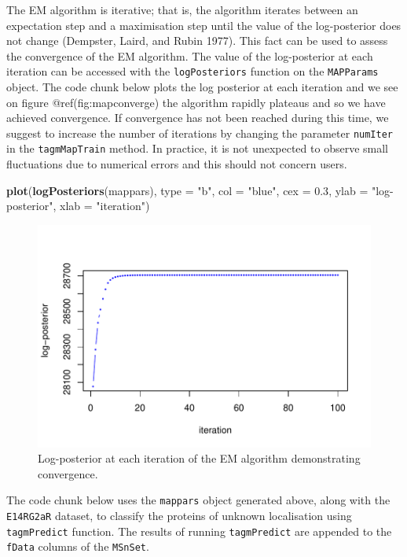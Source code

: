 \documentclass[
]{article}
\newenvironment{Shaded}{\begin{snugshade}}{\end{snugshade}}
\newcommand{\DataTypeTok}[1]{\textcolor[rgb]{0.13,0.29,0.53}{#1}}
\newcommand{\FloatTok}[1]{\textcolor[rgb]{0.00,0.00,0.81}{#1}}
\newcommand{\KeywordTok}[1]{\textcolor[rgb]{0.13,0.29,0.53}{\textbf{#1}}}
\newcommand{\NormalTok}[1]{#1}
\newcommand{\StringTok}[1]{\textcolor[rgb]{0.31,0.60,0.02}{#1}}
\begin{document}
The EM algorithm is iterative; that is, the algorithm iterates between
an expectation step and a maximisation step until the value of the
log-posterior does not change (Dempster, Laird, and Rubin 1977). This
fact can be used to assess the convergence of the EM algorithm. The
value of the log-posterior at each iteration can be accessed with the
\texttt{logPosteriors} function on the \texttt{MAPParams} object. The
code chunk below plots the log posterior at each iteration and we see on
figure @ref(fig:mapconverge) the algorithm rapidly plateaus and so we
have achieved convergence. If convergence has not been reached during
this time, we suggest to increase the number of iterations by changing
the parameter \texttt{numIter} in the \texttt{tagmMapTrain} method. In
practice, it is not unexpected to observe small fluctuations due to
numerical errors and this should not concern users.

\begin{Shaded}
\begin{Highlighting}[]
\KeywordTok{plot}\NormalTok{(}\KeywordTok{logPosteriors}\NormalTok{(mappars), }\DataTypeTok{type =} \StringTok{"b"}\NormalTok{, }\DataTypeTok{col =} \StringTok{"blue"}\NormalTok{,}
     \DataTypeTok{cex =} \FloatTok{0.3}\NormalTok{, }\DataTypeTok{ylab =} \StringTok{"log-posterior"}\NormalTok{, }\DataTypeTok{xlab =} \StringTok{"iteration"}\NormalTok{)}
\end{Highlighting}
\end{Shaded}

\begin{figure}
\includegraphics[width=0.8\linewidth]{F1000TAGMworkflow_rev1_files/figure-latex/mapconverge-1} \caption{Log-posterior at each iteration of the EM algorithm demonstrating convergence.}\label{fig:mapconverge}
\end{figure}

The code chunk below uses the \texttt{mappars} object generated above,
along with the \texttt{E14RG2aR} dataset, to classify the proteins of
unknown localisation using \texttt{tagmPredict} function. The results of
running \texttt{tagmPredict} are appended to the \texttt{fData} columns
of the \texttt{MSnSet}.
\end{document}
